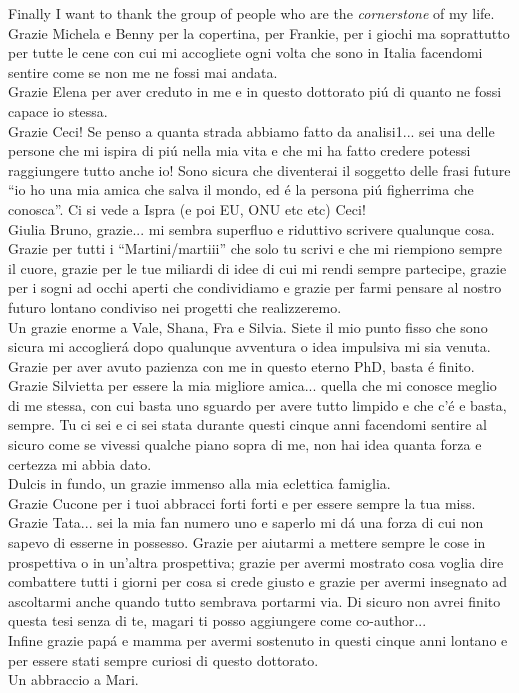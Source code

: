 \begin{acknowledgements}
{Finally I want to thank the group of people who are the \emph{cornerstone} of my life. \\
Grazie Michela e Benny per la copertina, per Frankie, per i giochi ma soprattutto per tutte le cene con cui mi accogliete ogni volta che sono in Italia facendomi sentire come se non me ne fossi mai andata. \\
Grazie Elena per aver creduto in me e in questo dottorato pi\'u di quanto ne fossi capace io stessa. \\
Grazie Ceci! Se penso a quanta strada abbiamo fatto da analisi1... sei una delle persone che mi ispira di pi\'u nella mia vita e che mi ha fatto credere potessi raggiungere tutto anche io! Sono sicura che diventerai il soggetto delle frasi future ``io ho una mia amica che salva il mondo, ed \'e la persona pi\'u figherrima che conosca''. Ci si vede a Ispra (e poi EU, ONU etc etc) Ceci!\\
Giulia Bruno, grazie... mi sembra superfluo e riduttivo scrivere qualunque cosa. Grazie per tutti i ``Martini/martiii'' che solo tu scrivi e che mi riempiono sempre il cuore, grazie per le tue miliardi di idee di cui mi rendi sempre partecipe, grazie per i sogni ad occhi aperti che condividiamo e grazie per farmi pensare al nostro futuro lontano condiviso nei progetti che realizzeremo. \\
Un grazie enorme a Vale, Shana, Fra e Silvia. Siete il mio punto fisso che sono sicura mi accoglier\'a dopo qualunque avventura o idea impulsiva mi sia venuta. Grazie per aver avuto pazienza con me in questo eterno PhD, basta \'e finito. \\
Grazie Silvietta per essere la mia migliore amica... quella che mi conosce meglio di me stessa, con cui basta uno sguardo per avere tutto limpido e che c'\'e e basta, sempre. Tu ci sei e ci sei stata durante questi cinque anni facendomi sentire al sicuro come se vivessi qualche piano sopra di me, non hai idea quanta forza e certezza mi abbia dato.\\
Dulcis in fundo, un grazie immenso alla mia eclettica famiglia.\\
Grazie Cucone per i tuoi abbracci forti forti e per essere sempre la tua miss.\\
Grazie Tata... sei la mia fan numero uno e saperlo mi d\'a una forza di cui non sapevo di esserne in possesso. Grazie per aiutarmi a mettere sempre le cose in prospettiva o in un'altra prospettiva; grazie per avermi mostrato cosa voglia dire combattere tutti i giorni per cosa si crede giusto e grazie per avermi insegnato ad ascoltarmi anche quando tutto sembrava portarmi via. Di sicuro non avrei finito questa tesi senza di te, magari ti posso aggiungere come co-author... \\
Infine grazie pap\'a e mamma per avermi sostenuto in questi cinque anni lontano e per essere stati sempre curiosi di questo dottorato.\\
Un abbraccio a Mari.

}
\end{acknowledgements}
